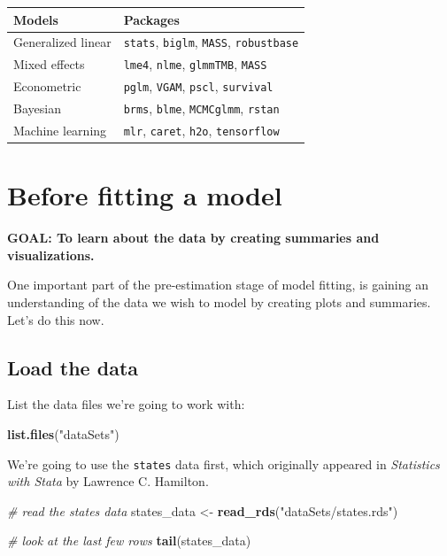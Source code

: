 \documentclass[
]{book}
\newenvironment{Shaded}{\begin{snugshade}}{\end{snugshade}}
\newcommand{\CommentTok}[1]{\textcolor[rgb]{0.56,0.35,0.01}{\textit{#1}}}
\newcommand{\KeywordTok}[1]{\textcolor[rgb]{0.13,0.29,0.53}{\textbf{#1}}}
\newcommand{\NormalTok}[1]{#1}
\newcommand{\StringTok}[1]{\textcolor[rgb]{0.31,0.60,0.02}{#1}}
\begin{document}
\begin{longtable}[]{@{}ll@{}}
\toprule
Models & Packages\tabularnewline
\midrule
\endhead
Generalized linear & \texttt{stats}, \texttt{biglm}, \texttt{MASS}, \texttt{robustbase}\tabularnewline
Mixed effects & \texttt{lme4}, \texttt{nlme}, \texttt{glmmTMB}, \texttt{MASS}\tabularnewline
Econometric & \texttt{pglm}, \texttt{VGAM}, \texttt{pscl}, \texttt{survival}\tabularnewline
Bayesian & \texttt{brms}, \texttt{blme}, \texttt{MCMCglmm}, \texttt{rstan}\tabularnewline
Machine learning & \texttt{mlr}, \texttt{caret}, \texttt{h2o}, \texttt{tensorflow}\tabularnewline
\bottomrule
\end{longtable}

\hypertarget{before-fitting-a-model}{%
\section{Before fitting a model}\label{before-fitting-a-model}}

\textbf{GOAL: To learn about the data by creating summaries and visualizations.}

One important part of the pre-estimation stage of model fitting, is gaining an understanding
of the data we wish to model by creating plots and summaries. Let's do this now.

\hypertarget{load-the-data}{%
\subsection{Load the data}\label{load-the-data}}

List the data files we're going to work with:

\begin{Shaded}
\begin{Highlighting}[]
\KeywordTok{list.files}\NormalTok{(}\StringTok{"dataSets"}\NormalTok{)}
\end{Highlighting}
\end{Shaded}

We're going to use the \texttt{states} data first, which originally appeared in \emph{Statistics with Stata} by Lawrence C. Hamilton.

\begin{Shaded}
\begin{Highlighting}[]
  \CommentTok{# read the states data}
\NormalTok{  states_data <-}\StringTok{ }\KeywordTok{read_rds}\NormalTok{(}\StringTok{"dataSets/states.rds"}\NormalTok{)}

  \CommentTok{# look at the last few rows}
  \KeywordTok{tail}\NormalTok{(states_data)}
\end{Highlighting}
\end{Shaded}
\end{document}
